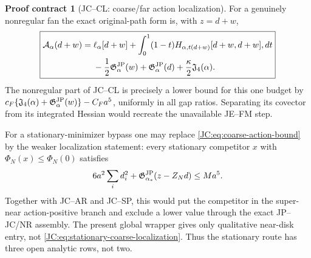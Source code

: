 \documentclass[11pt]{amsart}
\providecommand{\mathscr}{\mathcal}
\numberwithin{equation}{section}
\theoremstyle{definition}
\newtheorem{contract}[theorem]{Proof contract}
\theoremstyle{remark}
\newcommand{\Jfour}{\mathfrak J_4}
\newcommand{\Gjp}{\mathfrak G^{\rm JP}}
\providecommand{\mathscr}[1]{\mathcal{#1}}
\begin{document}
\begin{contract}[JC--CL: coarse/far action localization]
For a genuinely nonregular fan the exact original-path form is, with
$z=d+w$,
\begin{equation}\label{JC:eq:nonregular-original-path-action}
 \boxed{
 \begin{aligned}
 \mathscr A_\alpha(d+w)={}&\ell_\alpha[d+w]
 +\int_0^1(1-t)
 H_{\alpha,t(d+w)}[d+w,d+w],dt\\
 &-\frac12\Gjp_\alpha(w)+\Gjp_\alpha(d)
 +\frac\kappa2\Jfour(\alpha).
 \end{aligned}}
\end{equation}
The nonregular part of JC--CL is precisely a lower bound for this one
budget by $c_F\{\Jfour(\alpha)+\Gjp_\alpha(w)\}-C_Fa^5$, uniformly in
all gap ratios.  Separating its covector from its integrated Hessian would
recreate the unavailable JE--FM step.

For a stationary-minimizer bypass one may replace
\eqref{JC:eq:coarse-action-bound} by the weaker localization statement:
every stationary competitor $x$ with
$\Phi_N(x)\le\Phi_N(0)$ satisfies
\begin{equation}\label{JC:eq:stationary-coarse-localization}
 6a^2\sum_i d_i^2
 +\Gjp_{\alpha_*}(z-Z_Nd)\le Ma^5.
\end{equation}
Together with JC--AR and JC--SP, this would put the competitor in the
super-near action-positive branch and exclude a lower value through the
exact JP--JC/NR assembly.  The present global wrapper
gives only qualitative near-disk entry, not
\eqref{JC:eq:stationary-coarse-localization}.  Thus the stationary route has
three open analytic rows, not two.
\end{contract}
\end{document}
